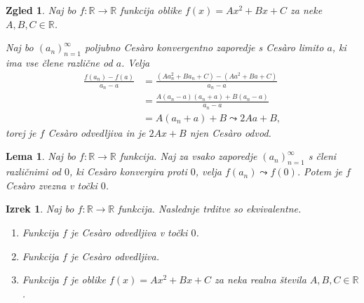 \documentclass[10pt,hyperref={unicode}]{beamer}
\newtheorem{izrek}{Izrek}
\newtheorem{lema}{Lema}
\newtheorem{zgled}{Zgled}
\begin{document}
\begin{frame}
    \begin{zgled}
        \label{vseodv}
        Naj bo $f: \mathbb{R} \rightarrow \mathbb{R}$ funkcija oblike $f(x) = Ax^2 + Bx + C$ za neke $A, B, C \in \mathbb{R}$. 
        \pause
        
        Naj bo $(a_n)_{n=1}^{\infty}$ poljubno Ces\`{a}ro konvergentno zaporedje s Ces\`{a}ro limito $a$, ki ima vse člene različne od $a$. 
        \pause
        Velja 
        \begin{align*}
            \frac{f(a_n)-f(a)}{a_n-a} &= \frac{(Aa_n^2 + Ba_n + C)-(Aa^2 + Ba + C)}{a_n-a}\\
            &= \frac{A(a_n-a)(a_n+a) + B(a_n-a)}{a_n-a}\\
            &= A(a_n+a) + B \leadsto 2Aa + B,
        \end{align*}
        torej je $f$ Ces\`{a}ro odvedljiva in je $2Ax + B$ njen Ces\`{a}ro odvod.
    \end{zgled}
\end{frame}

\begin{frame}
    \begin{lema}
        \label{lema}
        Naj bo $f: \mathbb{R} \rightarrow \mathbb{R}$ funkcija. Naj za vsako zaporedje $(a_n)_{n=1}^{\infty}$ s členi različnimi od $0$, ki Ces\`{a}ro konvergira proti $0$, velja $f(a_n) \leadsto f(0)$. Potem je $f$ Ces\`{a}ro zvezna v točki $0$.
    \end{lema}
\end{frame}

\begin{frame}
    \begin{izrek}
        \label{klasodv}
        Naj bo $f: \mathbb{R} \rightarrow \mathbb{R}$ funkcija. Naslednje trditve so ekvivalentne.
        \begin{enumerate}
            \item Funkcija $f$ je Ces\`{a}ro odvedljiva v točki $0$.
            \item Funkcija $f$ je Ces\`{a}ro odvedljiva.
            \item Funkcija $f$ je oblike $f(x) = Ax^2 + Bx + C$ za neka realna števila $A, B, C \in \mathbb{R}$.
        \end{enumerate}
    \end{izrek}
\end{frame}
\end{document}
